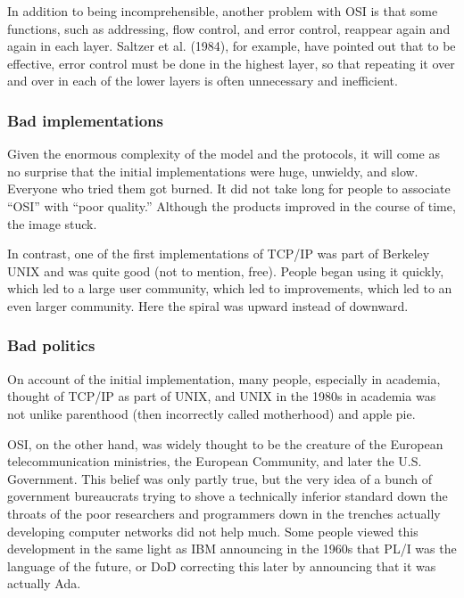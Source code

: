 In addition to being incomprehensible, another problem with OSI is that
some functions, such as addressing, flow control, and error control,
reappear again and again in each layer. Saltzer et al. (1984), for
example, have pointed out that to be effective, error control must be
done in the highest layer, so that repeating it over and over in each of
the lower layers is often unnecessary and inefficient.



\subsubsection{Bad implementations}

Given the enormous complexity of the model and the protocols, it will
come as no surprise that the initial implementations were huge,
unwieldy, and slow. Everyone who tried them got burned. It did not take
long for people to associate ``OSI'' with ``poor quality.''
Although the products improved in the course of time, the image stuck.

In contrast, one of the first implementations of TCP/IP was part of
Berkeley UNIX and was quite good (not to mention, free). People began
using it quickly, which led to a large user community, which led to
improvements, which led to an even larger community. Here the spiral was
upward instead of downward.


\subsubsection{Bad politics}

On account of the initial implementation, many people, especially in
academia, thought of TCP/IP as part of UNIX, and UNIX in the 1980s in
academia was not unlike parenthood (then incorrectly called motherhood)
and apple pie.

OSI, on the other hand, was widely thought to be the creature of the
European telecommunication ministries, the European Community, and later
the U.S. Government. This belief was only partly true, but the very idea
of a bunch of government bureaucrats trying to shove a technically
inferior standard down the throats of the poor researchers and
programmers down in the trenches actually developing computer networks
did not help much. Some people viewed this development in the same light
as IBM announcing in the 1960s that PL/I was the language of the future,
or DoD correcting this later by announcing that it was actually Ada.



